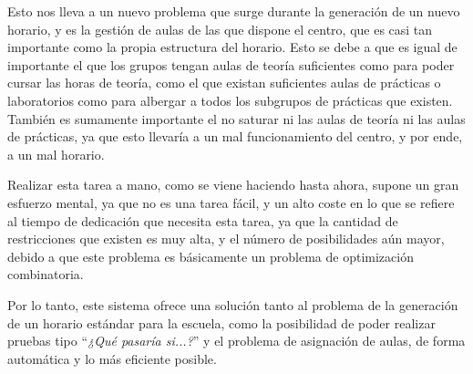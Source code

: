 Esto nos lleva a un nuevo problema que surge durante la generación de un nuevo horario, y es la gestión de aulas de las que dispone el centro, que es casi tan importante como la propia estructura del horario. Esto se debe a que es igual de importante el que los grupos tengan aulas de teoría suficientes como para poder cursar las horas de teoría, como el que existan suficientes aulas de prácticas o laboratorios como para albergar a todos los subgrupos de prácticas que existen. También es sumamente importante el no saturar ni las aulas de teoría ni las aulas de prácticas, ya que esto llevaría a un mal funcionamiento del centro, y por ende, a un mal horario.


Realizar esta tarea a mano, como se viene haciendo hasta ahora, supone un gran esfuerzo mental, ya que no es una tarea fácil, y un alto coste en lo que se refiere al tiempo de dedicación que necesita esta tarea, ya que la cantidad de restricciones que existen es muy alta, y el número de posibilidades aún mayor, debido a que este problema es básicamente un problema de optimización combinatoria.

Por lo tanto, este sistema ofrece una solución tanto al problema de la generación de un horario estándar para la escuela, como la posibilidad de poder realizar pruebas tipo ``\textit{¿Qué pasaría si...?}'' y el problema de asignación de aulas, de forma automática y lo más eficiente posible.




